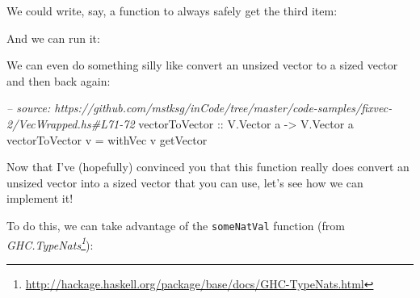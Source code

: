 \documentclass[]{article}
\newenvironment{Shaded}{}{}
\newcommand{\DataTypeTok}[1]{\textcolor[rgb]{0.56,0.13,0.00}{#1}}
\newcommand{\DecValTok}[1]{\textcolor[rgb]{0.25,0.63,0.44}{#1}}
\newcommand{\CommentTok}[1]{\textcolor[rgb]{0.38,0.63,0.69}{\textit{#1}}}
\newcommand{\OtherTok}[1]{\textcolor[rgb]{0.00,0.44,0.13}{#1}}
\newcommand{\FunctionTok}[1]{\textcolor[rgb]{0.02,0.16,0.49}{#1}}
\newcommand{\NormalTok}[1]{#1}
\renewcommand{\href}[2]{#2\footnote{\url{#1}}}
\begin{document}
We could write, say, a function to always safely get the third item:

\begin{Shaded}
\end{Shaded}

And we can run it:

\begin{Shaded}
\end{Shaded}

We can even do something silly like convert an unsized vector to a sized vector
and then back again:

\begin{Shaded}
\begin{Highlighting}[]
\CommentTok{-- source: https://github.com/mstksg/inCode/tree/master/code-samples/fixvec-2/VecWrapped.hs#L71-72}
\OtherTok{vectorToVector ::} \DataTypeTok{V.Vector}\NormalTok{ a }\OtherTok{->} \DataTypeTok{V.Vector}\NormalTok{ a}
\NormalTok{vectorToVector v }\FunctionTok{=}\NormalTok{ withVec v getVector}
\end{Highlighting}
\end{Shaded}

Now that I've (hopefully) convinced you that this function really does convert
an unsized vector into a sized vector that you can use, let's see how we can
implement it!

To do this, we can take advantage of the \texttt{someNatVal} function (from
\emph{\href{http://hackage.haskell.org/package/base/docs/GHC-TypeNats.html}{GHC.TypeNats}}):
\end{document}

